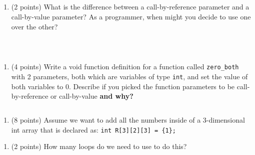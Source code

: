 \documentclass[
]{article}
\providecommand{\tightlist}{%
  \setlength{\itemsep}{0pt}\setlength{\parskip}{0pt}}
\begin{document}
\begin{verbatim}



\end{verbatim}

\begin{enumerate}
\def\labelenumi{\arabic{enumi}.}
\setcounter{enumi}{2}
\tightlist
\item
  (2 points) What is the difference between a call-by-reference
  parameter and a call-by-value parameter? As a programmer, when might
  you decide to use one over the other?
\end{enumerate}

\begin{verbatim}



\end{verbatim}

\begin{enumerate}
\def\labelenumi{\arabic{enumi}.}
\setcounter{enumi}{3}
\tightlist
\item
  (4 points) Write a void function definition for a function called
  \texttt{zero\_both} with 2 parameters, both which are variables of
  type \texttt{int}, and set the value of both variables to 0. Describe
  if you picked the function parameters to be call-by-reference or
  call-by-value \textbf{and why?}
\end{enumerate}

\begin{verbatim}
\end{verbatim}

\pagebreak

\begin{enumerate}
\def\labelenumi{\arabic{enumi}.}
\setcounter{enumi}{4}
\tightlist
\item
  (8 points) Assume we want to add all the numbers inside of a
  3-dimensional int array that is declared as:
  \texttt{int\ R{[}3{]}{[}2{]}{[}3{]}\ =\ \{1\};}
\end{enumerate}

\begin{enumerate}
\def\labelenumi{\alph{enumi}.}
\tightlist
\item
  (2 points) How many loops do we need to use to do this?
\end{enumerate}

\begin{verbatim}

\end{verbatim}
\end{document}

